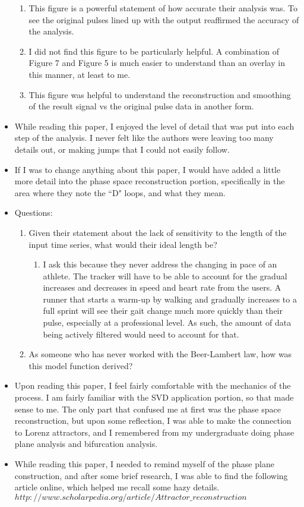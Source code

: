 \documentclass[letterpaper,10pt]{article}
\begin{document}
\begin{itemize}
\begin{enumerate}
\item This figure is a powerful statement of how accurate their analysis was. To see the original pulses lined up with the output reaffirmed the accuracy of the analysis.
\item I did not find this figure to be particularly helpful. A combination of Figure 7 and Figure 5 is much easier to understand than an overlay in this manner, at least to me.
\item This figure was helpful to understand the reconstruction and smoothing of the result signal vs the original pulse data in another form.
\end{enumerate}
\item While reading this paper, I enjoyed the level of detail that was put into each step of the analysis. I never felt like the authors were leaving too many details out, or making jumps that I could not easily follow.
\item If I was to change anything about this paper, I would have added a little more detail into the phase space reconstruction portion, specifically in the area where they note the ``D" loops, and what they mean.
\item Questions:
\begin{enumerate}
\item Given their statement about the lack of sensitivity to the length of the input time series, what would their ideal length be?
\begin{enumerate}
\item I ask this because they never address the changing in pace of an athlete. The tracker will have to be able to account for the gradual increases and decreases in speed and heart rate from the users. A runner that starts a warm-up by walking and gradually increases to a full sprint will see their gait change much more quickly than their pulse, especially at a professional level. As such, the amount of data being actively filtered would need to account for that.
\end{enumerate}
\item As someone who has never worked with the Beer-Lambert law, how was this model function derived?
\end{enumerate}
\item Upon reading this paper, I feel fairly comfortable with the mechanics of the process. I am fairly familiar with the SVD application portion, so that made sense to me. The only part that confused me at first was the phase space reconstruction, but upon some reflection, I was able to make the connection to Lorenz attractors, and I remembered from my undergraduate doing phase plane analysis and bifurcation analysis.
\item While reading this paper, I needed to remind myself of the phase plane construction, and after some brief research, I was able to find the following article online, which helped me recall some hazy details.\\
$http://www.scholarpedia.org/article/Attractor\_reconstruction$
\end{itemize}
\end{document}
